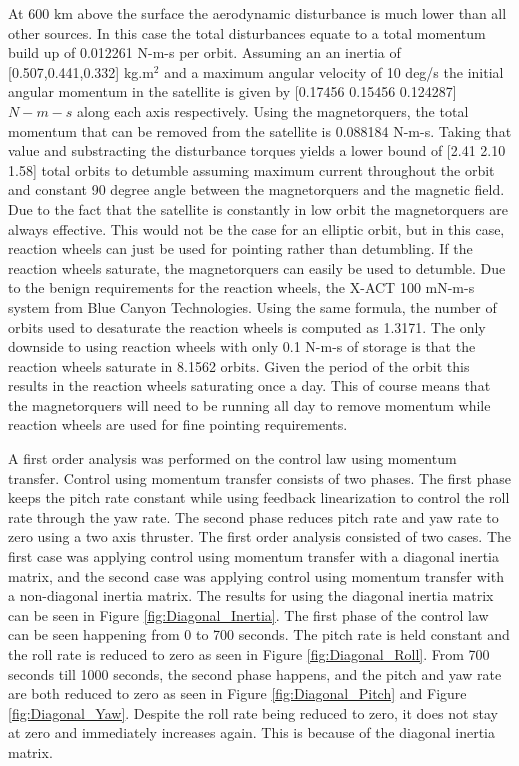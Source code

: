 \documentclass[conf]{new-aiaa}
\begin{document}
At 600 km above the surface the aerodynamic disturbance is much lower than all other sources. In this case the total disturbances equate to a total momentum build up of 0.012261 N-m-s per orbit. Assuming an an inertia of [0.507,0.441,0.332] kg.m$^{2}$ and a maximum angular velocity of 10 deg/s the initial angular momentum in the satellite is given by [0.17456 0.15456 0.124287] $N-m-s$ along each axis respectively. Using the magnetorquers, the total momentum that can be removed from the satellite is 0.088184 N-m-s. Taking that value and substracting the disturbance torques yields a lower bound of [2.41 2.10 1.58] total orbits to detumble assuming maximum current throughout the orbit and constant 90 degree angle between the magnetorquers and the magnetic field. Due to the fact that the satellite is constantly in low orbit the magnetorquers are always effective. This would not be the case for an elliptic orbit, but in this case, reaction wheels can just be used for pointing rather than detumbling. If the reaction wheels saturate, the magnetorquers can easily be used to detumble. Due to the benign requirements for the reaction wheels, the X-ACT 100 mN-m-s system from Blue Canyon Technologies\cite{RWP500}. Using the same formula, the number of orbits used to desaturate the reaction wheels is computed as 1.3171. The only downside to using reaction wheels with only 0.1 N-m-s of storage is that the reaction wheels saturate in 8.1562 orbits. Given the period of the orbit this results in the reaction wheels saturating once a day. This of course means that the magnetorquers will need to be running all day to remove momentum while reaction wheels are used for fine pointing requirements.   

A first order analysis was performed on the control law using momentum transfer. Control using momentum transfer consists of two phases. The first phase keeps the pitch rate constant while using feedback linearization to control the roll rate through the yaw rate. The second phase reduces pitch rate and yaw rate to zero using a two axis thruster. The first order analysis consisted of two cases. The first case was applying control using momentum transfer with a diagonal inertia matrix, and the second case was applying control using momentum transfer with a non-diagonal inertia matrix. The results for using the diagonal inertia matrix can be seen in Figure \ref{fig:Diagonal_Inertia}. The first phase of the control law can be seen happening from 0 to 700 seconds. The pitch rate is held constant and the roll rate is reduced to zero as seen in Figure \ref{fig:Diagonal_Roll}. From 700 seconds till 1000 seconds, the second phase happens, and the pitch and yaw rate are both reduced to zero as seen in Figure \ref{fig:Diagonal_Pitch} and Figure \ref{fig:Diagonal_Yaw}. Despite the roll rate being reduced to zero, it does not stay at zero and immediately increases again. This is because of the diagonal inertia matrix. 
\end{document}
